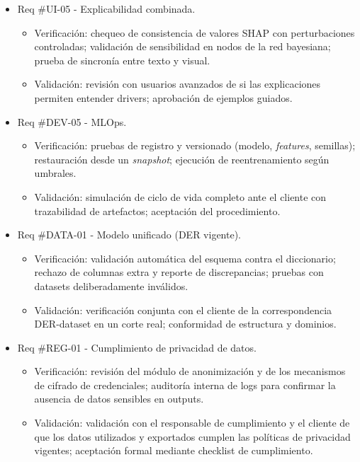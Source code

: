 \documentclass[12pt]
{charter}
\begin{document}
\begin{itemize}
\item Req \#UI-05 - Explicabilidad combinada.
  \begin{itemize}
    \item Verificación: chequeo de consistencia de valores SHAP con perturbaciones controladas; validación de sensibilidad en nodos de la red bayesiana; prueba de sincronía entre texto y visual.
    \item Validación: revisión con usuarios avanzados de si las explicaciones permiten entender drivers; aprobación de ejemplos guiados.
  \end{itemize}

\item Req \#DEV-05 - MLOps.
  \begin{itemize}
    \item Verificación: pruebas de registro y versionado (modelo, \textit{features}, semillas); restauración desde un \textit{snapshot}; ejecución de reentrenamiento según umbrales.
    \item Validación: simulación de ciclo de vida completo ante el cliente con trazabilidad de artefactos; aceptación del procedimiento.
  \end{itemize}

\item Req \#DATA-01 - Modelo unificado (DER vigente).
  \begin{itemize}
    \item Verificación: validación automática del esquema contra el diccionario; rechazo de columnas extra y reporte de discrepancias; pruebas con datasets deliberadamente inválidos.
    \item Validación: verificación conjunta con el cliente de la correspondencia DER-dataset en un corte real; conformidad de estructura y dominios.
  \end{itemize}

\item Req \#REG-01 - Cumplimiento de privacidad de datos.
  \begin{itemize}
    \item Verificación: revisión del módulo de anonimización y de los mecanismos de cifrado de credenciales; auditoría interna de logs para confirmar la ausencia de datos sensibles en outputs.
    \item Validación: validación con el responsable de cumplimiento y el cliente de que los datos utilizados y exportados cumplen las políticas de privacidad vigentes; aceptación formal mediante checklist de cumplimiento.
  \end{itemize}


\end{itemize}
\end{document}
